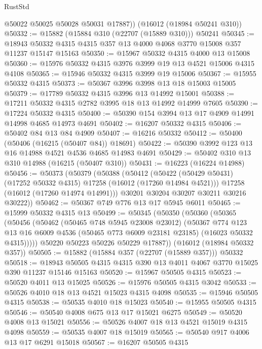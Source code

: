 \begin{lexlean}{RustStd}
\begin{coremodule}
        @50022
        @50025
        @50028
        @50031
        @17887))
    (@16012 (@18984 @50241 @310))
@50332 := @15882 (@15884 @310 (@22707 (@15889 @310))) @50241
@50345 := @18943 @50332 @4315 @4315 @357 @13 @4000 @4068 @3770 @15008 @357 @11237 @15147 @15163
@50350 := @15967 @50332 @4315 @4000 @13 @15008
@50360 := @15976 @50332 @4315 @3976 @3999 @19 @13 @4521 @15006 @4315 @4108
@50365 := @15946 @50332 @4315 @3999 @19 @15006
@50367 := @15955 @50332 @4315
@50373 := @50367 @3996 @3998 @13 @18 @15003 @15005
@50379 := @17789 @50332 @4315 @3996 @13 @14992 @15001
@50388 := @17211 @50332 @4315 @2782 @3995 @18 @13 @14992 @14999 @7605
@50390 := @17224 @50332 @4315
@50400 := @50390 @154 @3994 @13 @17 @4909 @14991 @14998 @4685 @14973 @4691
@50402 := @16207 @50332 @4315
@50406 := @50402 @84 @13 @84 @4909
@50407 := @16216 @50332
@50412 := @50400 (@50406 (@16215 (@50407 @84)) @18691)
@50422 := @50390 @3992 @123 @13 @16 @14988 @4521 @4536 @4685 @14983 @4691
@50429 := @50402 @310 @13 @310 @14988 (@16215 (@50407 @310))
@50431 := @16223 (@16224 @14988)
@50456 := @50373
    (@50379
      (@50388
        (@50412
          (@50422 (@50429 @50431) (@17252 @50332 @4315) @17258 (@16012 (@17260 @14984 @4521)))
          @17258
          (@16012 (@17260 @14974 @14991)))
        @30201
        @30204
        @30207
        @30211
        @30216
        @30222))
@50462 := @50367 @749 @776 @13 @17 @5945 @6011
@50465 := @15999 @50332 @4315 @13
@50499 := @50345
    (@50350
      (@50360
        (@50365
          (@50456
            (@50462
              (@50465 @748 @5945 @23008 @23012)
              (@50367
                @774
                @123
                @13
                @16
                @6009
                @4536
                (@50465 @773 @6009 @23181 @23185)
                (@16023 @50332 @4315)))))
        @50220
        @50223
        @50226
        @50229
        @17887))
    (@16012 (@18984 @50332 @357))
@50505 := @15882 (@15884 @357 (@22707 (@15889 @357))) @50332
@50518 := @18943 @50505 @4315 @4315 @390 @13 @4011 @4067 @3770 @15025 @390 @11237 @15146 @15163
@50520 := @15967 @50505 @4315
@50523 := @50520 @4011 @13 @15025
@50526 := @15976 @50505 @4315 @3042
@50533 := @50526 @4010 @18 @13 @4521 @15023 @4315 @4098
@50535 := @15946 @50505 @4315
@50538 := @50535 @4010 @18 @15023
@50540 := @15955 @50505 @4315
@50546 := @50540 @4008 @675 @13 @17 @15021 @6275
@50549 := @50520 @4008 @13 @15021
@50556 := @50526 @4007 @18 @13 @4521 @15019 @4315 @4098
@50559 := @50535 @4007 @18 @15019
@50565 := @50540 @917 @4006 @13 @17 @6291 @15018
@50567 := @16207 @50505 @4315

\end{coremodule}
\end{lexlean}

